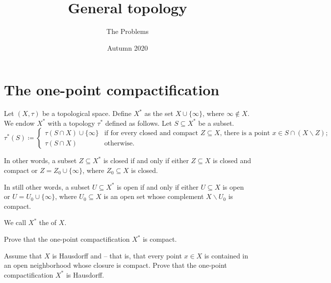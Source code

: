 \documentclass[a4paper,twoside,nols,nobib]{tufte-handout}
\title{General topology}
\author{The Problems}
\date{Autumn 2020}
\begin{document}
\maketitle

\section*{The one-point compactification}

\begin{dfn*}
	Let $(X,\tau)$ be a topological space.
	Define $X^{\ast}$ as the set $X \cup \{ \infty \}$, where $\infty \notin X$.
	We endow $X^{\ast}$ with a topology $\tau^{\ast}$ defined as follows.
	Let $S \subseteq X^{\ast}$ be a subset.
	\[
		\tau^{\ast}(S) \coloneq \begin{cases}
			\tau(S \cap X) \cup \{\infty\} & \text{if for every closed and compact }Z \subseteq X\text{, there is a point }x \in S\cap(X \smallsetminus Z)\text{;} \\
			\tau(S \cap X) & \text{otherwise.}
		\end{cases}
	\]

	In other words, a subset $Z \subseteq X^{\ast}$ is closed if and only if either $Z \subseteq X$ is closed and compact or $Z = Z_0 \cup \{\infty\}$, where $Z_0 \subseteq X$ is closed.

	In still other words, a subset $U \subseteq X^{\ast}$ is open if and only if either $U \subseteq X$ is open or $U = U_0 \cup \{\infty\}$, where $U_0 \subseteq X$ is an open set whose complement $X \smallsetminus U_0$ is compact.

	We call $X^{\ast}$ the  of $X$.
\end{dfn*}


\begin{Problem}
	\noindent
	Prove that the one-point compactification $X^*$ is compact.
\end{Problem}


\begin{Problem}
	\noindent
	Assume that $X$ is Hausdorff and  -- that is, that every point $ x \in X$ is contained in an open neighborhood whose closure is compact.
	Prove that the one-point compactification $X^*$ is Hausdorff.
\end{Problem}
\end{document}
